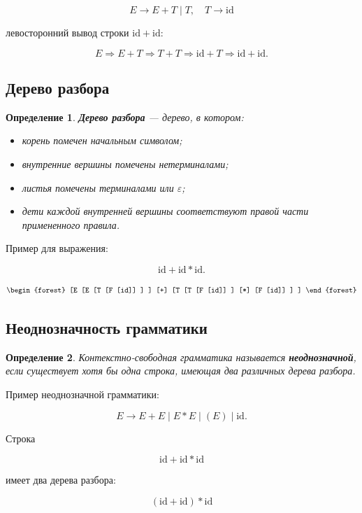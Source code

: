 \documentclass[12pt,a4paper]{article}
\newtheorem{definition}{Определение}
\begin{document}
\[
E \to E+T \mid T,\quad T \to \mathrm{id}
\]

левосторонний вывод строки $\mathrm{id}+\mathrm{id}$:

\[
E \Rightarrow E+T \Rightarrow T+T \Rightarrow \mathrm{id}+T \Rightarrow \mathrm{id}+\mathrm{id}.
\]

\subsection{Дерево разбора}

\begin{definition}
\textbf{Дерево разбора} --- дерево, в котором:
\begin{itemize}
    \item корень помечен начальным символом;
    \item внутренние вершины помечены нетерминалами;
    \item листья помечены терминалами или $\varepsilon$;
    \item дети каждой внутренней вершины соответствуют правой части примененного правила.
\end{itemize}
\end{definition}

Пример для выражения:

\[
\mathrm{id}+\mathrm{id}*\mathrm{id}.
\]

\[
\begin{forest}
[E
  [E
    [T
      [F [id]]
    ]
  ]
  [+]
  [T
    [T
      [F [id]]
    ]
    [*]
    [F [id]]
  ]
]
\end{forest}
\]

\subsection{Неоднозначность грамматики}

\begin{definition}
Контекстно-свободная грамматика называется \textbf{неоднозначной}, если существует хотя бы одна строка, имеющая два различных дерева разбора.
\end{definition}

Пример неоднозначной грамматики:

\[
E \to E+E \mid E*E \mid (E) \mid \mathrm{id}.
\]

Строка

\[
\mathrm{id}+\mathrm{id}*\mathrm{id}
\]

имеет два дерева разбора:

\[
(\mathrm{id}+\mathrm{id})*\mathrm{id}
\]
\end{document}
